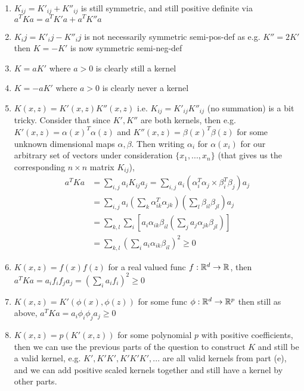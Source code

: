 %
%
\begin{answer}
\begin{enumerate}[label=(\alph*)]
\item $K_{ij} = K'_{ij} + K''_{ij}$ is still symmetric, and still positive definite via $a^T K a = a^T K' a + a^T K'' a$

\item $K_ij = K'_ij - K''_ij$ is not necessarily symmetric semi-pos-def as e.g. $K'' = 2 K'$ then $K = -K'$ is now symmetric semi-neg-def

\item $K = aK'$ where $a>0$ is clearly still a kernel

\item $K = -aK'$ where $a>0$ is clearly never a kernel

\item $K(x,z) = K'(x,z)K''(x,z)$ i.e. $K_{ij} = K'_{ij} K''_{ij}$ (no summation) is a bit tricky. Consider
that since $K', K''$ are both kernels, then e.g. $K'(x,z) = \alpha(x)^T \alpha(z)$ and $K''(x,z) = \beta(x)^T \beta(z)$ for some unknown dimensional maps $\alpha, \beta$. Then writing $\alpha_i$ for $\alpha(x_i)$ for our arbitrary set of vectors under consideration $\{x_1, ..., x_n\}$ (that gives us the corresponding $n \times n$ matrix $K_{ij}$),
\begin{align*}
	a^T K a 
	&= \sum_{i,j} a_i K_{ij} a_j 
	 = \sum_{i,j} a_i (\alpha_i^T \alpha_j \times \beta_i^T \beta_j) a_j
	\\
	&= \sum_{i,j} a_i (\sum_k \alpha_{ik}^T \alpha_{jk}) (\sum_l \beta_{il} \beta_{jl}) a_j
	\\
	&= \sum_{k,l} \sum_i \left [ a_i \alpha_{ik} \beta_{il} \left ( \sum_j a_j \alpha_{jk} \beta_{jl} \right)\right]
	\\
	&= \sum_{k,l} \left ( \sum_i a_i \alpha_{ik} \beta_{il} \right )^2 \geq 0
\end{align*}

\item $K(x,z) = f(x) f(z)$ for a real valued func $f: \mathbb{R}^d \to \mathbb{R}$, then $a^T K a = a_i f_i f_j a_j = (\sum_i a_i f_i)^2 \geq 0$

\item $K(x,z) = K'(\phi(x), \phi(z))$ for some func $\phi: \mathbb{R}^d \to \mathbb{R}^p$ then still as above, $a^T K a = a_i \phi_i \phi_j a_j \geq 0$

\item $K(x,z) = p(K'(x,z))$ for some polynomial $p$ with positive coefficients, then we can use the previous parts of the question to construct $K$ and still be a valid kernel, e.g. $K', K'K', K'K'K',...$ are all valid kernels from part (e), and we can add positive scaled kernels together and still have a kernel by other parts.
\end{enumerate}
\end{answer}
%
